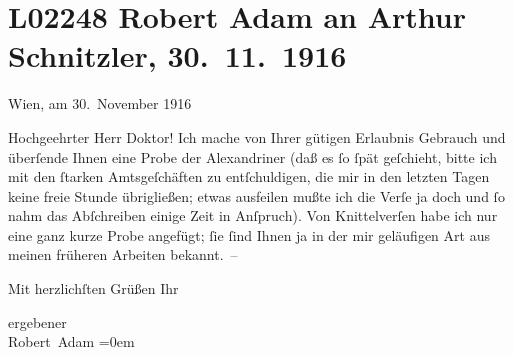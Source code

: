 

\section[Robert Adam an Arthur Schnitzler, 30. 11. 1916]{L02248 Robert Adam an Arthur Schnitzler, 30. 11. 1916}
\nopagebreak{}
\rehead{ }\normalsize\beginnumbering{}
\toendnotes[C]{\smallbreak\pagebreak[2]}
\pstart
           \raggedleft{}{\pb}Wien, am 30. November 1916\pend
           
\pstart{}Hochgeehrter Herr Doktor!\pend\vspace{0.5em}
\pstart
           Ich mache von Ihrer gütigen Erlaubnis Gebrauch und überſende Ihnen eine Probe der
               Alexandriner (daß es ſo ſpät geſchieht, bitte ich mit den ſtarken Amtsgeſchäften zu
               entſchuldigen, die mir in den letzten Tagen keine freie Stunde übrigließen; etwas
               ausfeilen mußte ich die Verſe ja doch und ſo nahm das Abſchreiben einige Zeit in
               Anſpruch). Von Knittelverſen habe ich nur eine ganz kurze Probe angefügt; ſie ſind
               Ihnen ja in der mir geläufi{\pb}gen Art aus meinen
               früheren Arbeiten bekannt. –\pend
           
\pstart
           Mit herzlichſten Grüßen Ihr\pend
           
\pstart
           ergebener{\\[\baselineskip]}\spacefill\mbox{Robert Adam}\pend
           \leftskip=0em{}\endnumbering{}  
      